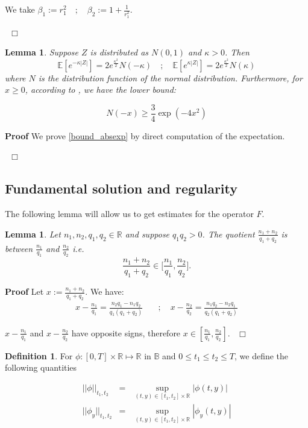 \documentclass[11pt, psfig]{article}
\newtheorem{lemma}[theorem]{Lemma}
\theoremstyle{definition}
\newtheorem{definition}[theorem]{Definition}
\theoremstyle{remark}
\numberwithin{equation}{section}
\def\sR{\mathbb{R}}
\def\sR{\mathbb{R}}
\def\sE{\mathbb{E}}
\newcommand{\be}{\begin{equation}}
\newcommand{\ee}{\end{equation}}
\def \proof{{\noindent \bf Proof}\quad}
\def \ep{\hbox{ }\hfill$\Box$}
\begin{document}
We take $\beta_1:= r_1^{2} \quad ; \quad \beta_2:= 1+\frac{1}{r_1^2}  $.

\ep

 \begin{lemma}
Suppose $Z $ is distributed as $ N(0,1)$ and $\kappa >0$. Then 
\be \label{bound_absexp}
\sE[e^{-\kappa |Z|}] = 2e^{\frac{\kappa^2}{2}} N(-\kappa) \quad ; \quad \sE[e^{\kappa |Z|}] = 2e^{\frac{\kappa^2}{2}} N(\kappa) 
\ee
where $N$ is the distribution function of the normal distribution.
Furthermore, for $x\geq 0$, according to \cite{Ch_Co_Mi1}, we have the lower bound:

\be \label{lower_N}
N(-x)\geq \frac{3}{4}\exp(-4 x^2)
\ee
\end{lemma}
\proof
We prove \eqref{bound_absexp} by direct computation of the expectation.

\ep

\subsection*{Fundamental solution and regularity}

The following lemma will allow us to get estimates for the operator $F$.


\begin{lemma}\label{quotients}
Let $n_1, n_2, q_1, q_2 \in \sR$ and suppose $q_1 q_2>0$.
The quotient $\frac{n_1+n_2}{q_1+q_2} $ is between $\frac{n_1}{q_1}$ and $\frac{n_2}{q_2}$ i.e.
$$\frac{n_1+n_2}{q_1+q_2}\in \bigg[\frac{n_1}{q_1}, \frac{n_2}{q_2}\bigg].$$
\end{lemma}

\proof
Let $x:=\frac{n_1+n_2}{q_1+q_2} $. We have: 
 \begin{eqnarray*}
x-\frac{n_1}{q_1} = \frac{n_2 q_1 - n_1 q_2}{q_1(q_1+q_2)} \quad & ; \quad x-\frac{n_2}{q_2} = \frac{n_1 q_2 - n_2 q_1}{q_2(q_1+q_2)} 
\end{eqnarray*}

$x-\frac{n_1}{q_1} $ and $x-\frac{n_2}{q_2}$ have opposite signs, therefore $x\in [ \frac{n_1}{q_1} , \frac{n_2}{q_2}]$.
 \ep

\begin{definition}
For $\phi: [0,T]\times \sR \mapsto \sR$ in $\mathbb{B}$ and $0\leq t_1\leq t_2\leq T$, we define the following quantities

\begin{eqnarray}
||\phi||_{t_1,t_2} &=& \sup_{(t,y)\in [t_1,t_2]\times \sR} |\phi(t,y)|  \\ 
||\phi_y||_{t_1,t_2} &=& \sup_{(t,y)\in [t_1,t_2]\times \sR} |\phi_y(t,y)|  
\end{eqnarray}


\end{definition}
\end{document}
